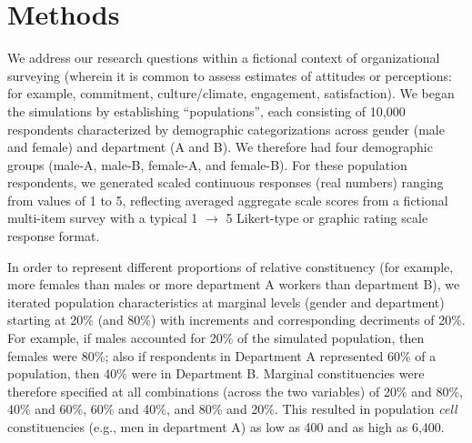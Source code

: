 \documentclass[
  man,mask]{apa7}
\begin{document}
\hypertarget{methods}{%
\section{Methods}\label{methods}}

We address our research questions within a fictional context of organizational surveying (wherein it is common to assess estimates of attitudes or perceptions: for example, commitment, culture/climate, engagement, satisfaction). We began the simulations by establishing ``populations'', each consisting of 10,000 respondents characterized by demographic categorizations across gender (male and female) and department (A and B). We therefore had four demographic groups (male-A, male-B, female-A, and female-B). For these population respondents, we generated scaled continuous responses (real numbers) ranging from values of 1 to 5, reflecting averaged aggregate scale scores from a fictional multi-item survey with a typical 1 \(\rightarrow\) 5 Likert-type or graphic rating scale response format.

In order to represent different proportions of relative constituency (for example, more females than males or more department A workers than department B), we iterated population characteristics at marginal levels (gender and department) starting at 20\% (and 80\%) with increments and corresponding decriments of 20\%. For example, if males accounted for 20\% of the simulated population, then females were 80\%; also if respondents in Department A represented 60\% of a population, then 40\% were in Department B. Marginal constituencies were therefore specified at all combinations (across the two variables) of 20\% and 80\%, 40\% and 60\%, 60\% and 40\%, and 80\% and 20\%. This resulted in population \emph{cell} constituencies (e.g., men in department A) as low as 400 and as high as 6,400.
\end{document}
